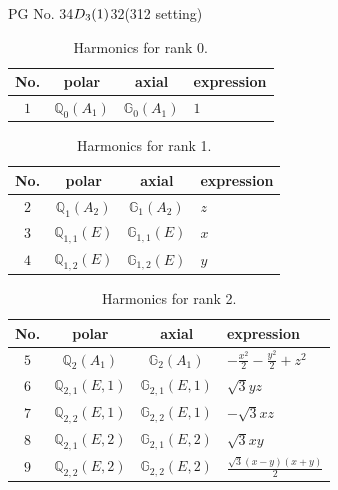 \documentclass[fleqn,8pt,landscape]{jsarticle}
\begin{document}
\setcounter{MaxMatrixCols}{32}

\renewcommand{\tablename}{Table~}
\renewcommand{\figurename}{Figure~}
\begin{center}
\LARGE
PG No. 34\quad$D_{\rm 3}(1)$\quad$32$\quad(312 setting)\quad[ trigonal ]
\end{center}
\begin{table}[ht!]
\begin{center}
\caption{Harmonics for rank 0.}
\renewcommand{\arraystretch}{1.3}
\begin{tabular}{cccl} \hline \hline
No. & polar & axial & expression \\ \hline
$ 1 $ & $ \mathbb{Q}_{0}(A_{1}) $ & $ \mathbb{G}_{0}(A_{1}) $ & $ 1 $ \\
 \hline \hline
\end{tabular}
\end{center}
\end{table}
\begin{table}[ht!]
\begin{center}
\caption{Harmonics for rank 1.}
\renewcommand{\arraystretch}{1.3}
\begin{tabular}{cccl} \hline \hline
No. & polar & axial & expression \\ \hline
$ 2 $ & $ \mathbb{Q}_{1}(A_{2}) $ & $ \mathbb{G}_{1}(A_{2}) $ & $ z $ \\
$ 3 $ & $ \mathbb{Q}_{1,1}(E) $ & $ \mathbb{G}_{1,1}(E) $ & $ x $ \\
$ 4 $ & $ \mathbb{Q}_{1,2}(E) $ & $ \mathbb{G}_{1,2}(E) $ & $ y $ \\
 \hline \hline
\end{tabular}
\end{center}
\end{table}
\begin{table}[ht!]
\begin{center}
\caption{Harmonics for rank 2.}
\renewcommand{\arraystretch}{1.3}
\begin{tabular}{cccl} \hline \hline
No. & polar & axial & expression \\ \hline
$ 5 $ & $ \mathbb{Q}_{2}(A_{1}) $ & $ \mathbb{G}_{2}(A_{1}) $ & $ - \frac{x^{2}}{2} - \frac{y^{2}}{2} + z^{2} $ \\
$ 6 $ & $ \mathbb{Q}_{2,1}(E,1) $ & $ \mathbb{G}_{2,1}(E,1) $ & $ \sqrt{3} y z $ \\
$ 7 $ & $ \mathbb{Q}_{2,2}(E,1) $ & $ \mathbb{G}_{2,2}(E,1) $ & $ - \sqrt{3} x z $ \\
$ 8 $ & $ \mathbb{Q}_{2,1}(E,2) $ & $ \mathbb{G}_{2,1}(E,2) $ & $ \sqrt{3} x y $ \\
$ 9 $ & $ \mathbb{Q}_{2,2}(E,2) $ & $ \mathbb{G}_{2,2}(E,2) $ & $ \frac{\sqrt{3} \left(x - y\right) \left(x + y\right)}{2} $ \\
 \hline \hline
\end{tabular}
\end{center}
\end{table}
\end{document}
